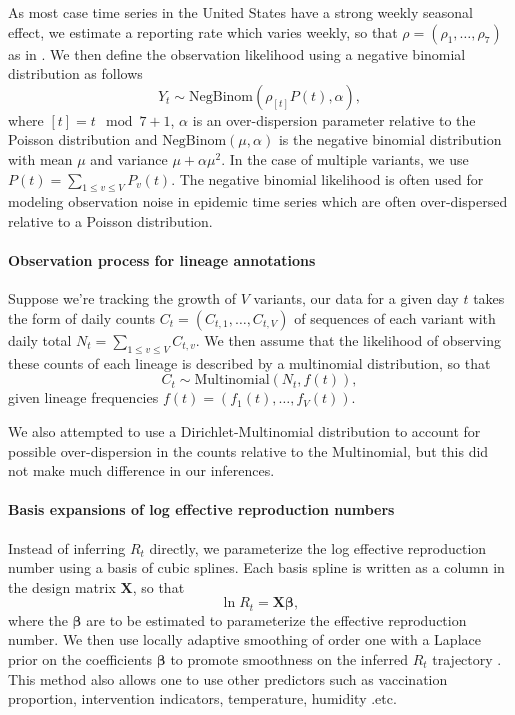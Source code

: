 \documentclass[12pt]{article}
\renewcommand{\vec}[1]{\boldsymbol{#1}}
\begin{document}
As most case time series in the United States have a strong weekly seasonal effect, we estimate a reporting rate which varies weekly, so that $\rho = (\rho_{1}, \ldots, \rho_{7})$ as in \cite{Abbott2020}.
We then define the observation likelihood using a negative binomial distribution as follows
\begin{equation}
  Y_{t} \sim \text{NegBinom}(\rho_{[t]} P(t),  \alpha),
\end{equation}
where $[t] = t \mod 7 + 1$, $\alpha$ is an over-dispersion parameter relative to the Poisson distribution and $\text{NegBinom}(\mu, \alpha)$ is the negative binomial distribution with mean $\mu$ and variance  $\mu + \alpha\mu^{2}$. In the case of multiple variants, we use $P(t) = \sum_{1\leq v \leq V} P_{v}(t)$.
The negative binomial likelihood is often used for modeling observation noise in epidemic time series which are often over-dispersed relative to a Poisson distribution. %

\paragraph{Observation process for lineage annotations}%

Suppose we're tracking the growth of $V$ variants, our data for a given day $t$ takes the form of daily counts $C_{t} = (C_{t,1}, \ldots, C_{t,V})$ of sequences of each variant with daily total $N_{t} = \sum_{1\leq v \leq V} C_{t, v}$.
We then assume that the likelihood of observing these counts of each lineage is described by a multinomial distribution, so that
\begin{equation}
    C_{t} \sim \text{Multinomial}(N_{t}, f(t)),
\end{equation}
given lineage frequencies $f(t) = (f_{1}(t), \ldots, f_{V}(t))$.

We also attempted to use a Dirichlet-Multinomial distribution to account for possible over-dispersion in the counts relative to the Multinomial, but this did not make much difference in our inferences.

\paragraph{Basis expansions of log effective reproduction numbers}%

Instead of inferring $R_{t}$ directly, we parameterize the log effective reproduction number using a basis of cubic splines.
Each basis spline is written as a column in the design matrix $\vec{X}$, so that
\begin{equation}
  \ln R_{t} = \vec{X} \vec{\beta},
\end{equation}
where the $\vec{\beta}$ are to be estimated to parameterize the effective reproduction number.
We then use locally adaptive smoothing of order one with a Laplace prior on the coefficients $\vec{\beta}$ to promote smoothness on the inferred $R_t$ trajectory \cite{Faulkner2018}.
This method also allows one to use other predictors such as vaccination proportion, intervention indicators, temperature, humidity .etc.
\end{document}
